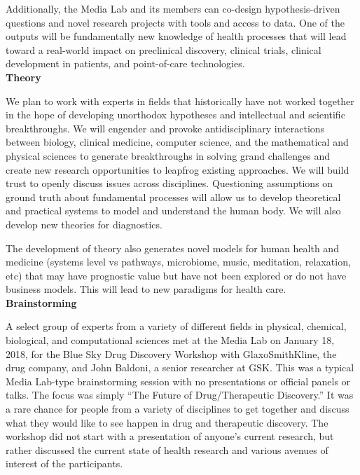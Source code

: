 Additionally, the Media Lab and its members can co-design hypothesis-driven questions and novel research projects with tools and access to data. One of the outputs will be fundamentally new knowledge of health processes that will lead toward a real-world impact on preclinical discovery, clinical trials, clinical development in patients, and point-of-care technologies.\\

\textbf{Theory}

We plan to work with experts  in fields that historically have not worked together in the hope of developing unorthodox hypotheses and intellectual and scientific breakthroughs. We will engender and provoke antidisciplinary interactions between biology, clinical medicine, computer science, and the mathematical and physical sciences to generate breakthroughs in solving grand challenges and create new research opportunities to leapfrog existing approaches. We will build trust to openly discuss issues across disciplines. Questioning assumptions on ground truth about fundamental processes will allow us to develop theoretical and practical systems to model and understand the human body. We will also develop new theories for diagnostics.

The development of theory also generates novel models for human health and medicine (systems level vs pathways, microbiome, music, meditation, relaxation, etc) that may have prognostic value but have not been explored or do not have business models. This will lead to new paradigms for health care. \\

\textbf{Brainstorming}

A select group of experts from a variety of different fields in physical, chemical, biological, and computational sciences met at the Media Lab on January 18, 2018, for the Blue Sky Drug Discovery Workshop with GlaxoSmithKline, the drug company, and John Baldoni, a senior researcher at GSK. This was a typical Media Lab-type brainstorming session with no presentations or official panels or talks. The focus was simply ``The Future of Drug/Therapeutic Discovery.'' It was a rare chance for people from a variety of disciplines to get together and discuss what they would like to see happen in drug and therapeutic discovery. The workshop did not start with a presentation of anyone's current research, but rather discussed the current state of health research and various avenues of interest of the participants. \\

